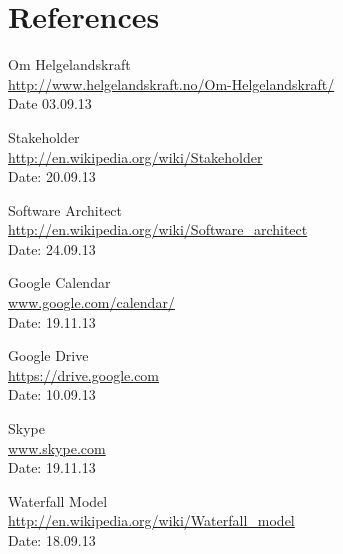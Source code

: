 \chapter{References}

\begingroup
\renewcommand{\chapter}[2]{} %
\begin{thebibliography}{99}



	Om Helgelandskraft \\
	\href{http://www.helgelandskraft.no/Om-Helgelandskraft/}{http://www.helgelandskraft.no/Om-Helgelandskraft/} \\
	Date 03.09.13

	Stakeholder \\
	\href{http://en.wikipedia.org/wiki/Stakeholder}{http://en.wikipedia.org/wiki/Stakeholder} \\
	Date: 20.09.13

	Software Architect \\
	\href{http://en.wikipedia.org/wiki/Software_architect}{http://en.wikipedia.org/wiki/Software\_architect} \\
	Date: 24.09.13

	Google Calendar \\
	\href {https://www.google.com/calendar/}{www.google.com/calendar/} \\
	Date: 19.11.13

	Google Drive \\
	\href{https://drive.google.com}{https://drive.google.com} \\
	Date: 10.09.13

	Skype \\
	\href{http://www.skype.com/en/}{www.skype.com} \\
	Date: 19.11.13


	Waterfall Model \\
	\href {http://en.wikipedia.org/wiki/Waterfall_model}{http://en.wikipedia.org/wiki/Waterfall\_model} \\
	Date: 18.09.13


\end{thebibliography}
